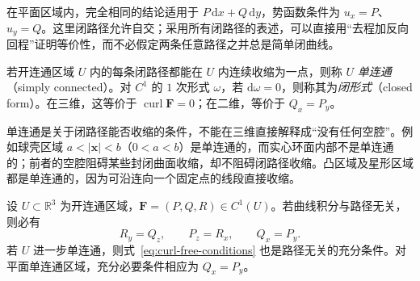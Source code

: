 \documentclass[UTF8,12pt,a4paper,fontset=fandol]{ctexbook}
\begin{document}
在平面区域内，完全相同的结论适用于 $P\,\mathrm dx+Q\,\mathrm dy$，势函数条件为 $u_x=P$、$u_y=Q$。这里闭路径允许自交；采用所有闭路径的表述，可以直接用“去程加反向回程”证明等价性，而不必假定两条任意路径之并总是简单闭曲线。

\begin{definition}
\label{def:simply-connected-and-closed-form}
若开连通区域 $U$ 内的每条闭路径都能在 $U$ 内连续收缩为一点，则称 $U$ \emph{单连通}（simply connected）。对 $C^1$ 的 $1$ 次形式 $\omega$，若 $\mathrm d\omega=0$，则称其为\emph{闭形式}（closed form）。在三维，这等价于 $\operatorname{curl}\boldsymbol F=0$；在二维，等价于 $Q_x=P_y$。
\end{definition}

单连通是关于闭路径能否收缩的条件，不能在三维直接解释成“没有任何空腔”。例如球壳区域 $a<|\boldsymbol x|<b$（$0<a<b$）是单连通的，而实心环面内部不是单连通的；前者的空腔阻碍某些封闭曲面收缩，却不阻碍闭路径收缩。凸区域及星形区域都是单连通的，因为可沿连向一个固定点的线段直接收缩。

\begin{theorem}
\label{thm:simply-connected-curl-free}
设 $U\subset\mathbb R^3$ 为开连通区域，$\boldsymbol F=(P,Q,R)\in C^1(U)$。若曲线积分与路径无关，则必有
\begin{equation}
\label{eq:curl-free-conditions}
    R_y=Q_z,\qquad P_z=R_x,\qquad Q_x=P_y.
\end{equation}
若 $U$ 进一步单连通，则式~\eqref{eq:curl-free-conditions} 也是路径无关的充分条件。对平面单连通区域，充分必要条件相应为 $Q_x=P_y$。
\end{theorem}
\end{document}
